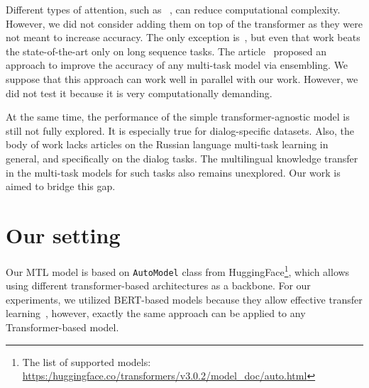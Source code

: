 Different types of attention, such as ~\cite{reformer}, can reduce computational complexity. However, we did not consider adding them on top of the transformer as they were not meant to increase accuracy. The only exception is~\cite{routing_transformers}, but even that work beats the state-of-the-art only on long sequence tasks.%
The article~\cite{MultitaskEnsemble:19} proposed an approach to improve the accuracy of any multi-task model via ensembling. We suppose that this approach can work well in parallel with our work. However, we did not test it because it is very computationally demanding.


At the same time, the performance of the simple transformer-agnostic model is still not fully explored. It is especially true for dialog-specific datasets. Also, the body of work lacks articles on the Russian language multi-task learning in general, and specifically on the dialog tasks. The multilingual knowledge transfer in the multi-task models for such tasks also remains unexplored. Our work is aimed to bridge this gap. 

\section{Our setting}


Our MTL model is based on \texttt{AutoModel} class from HuggingFace\footnote{The list of supported models: \url{https:/huggingface.co/transformers/v3.0.2/model\_doc/auto.html}}, which allows using different transformer-based architectures as a backbone. For our experiments, we utilized BERT-based models because they allow effective transfer learning~\cite{10.1007/978-3-031-19032-2_46,ksquad}, however, exactly the same approach can be applied to any Transformer-based model.

